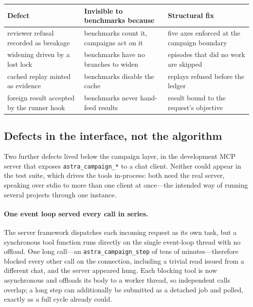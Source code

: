 \documentclass[11pt,a4paper]{article}
\newcommand{\code}[1]{\texttt{\small #1}}
\begin{document}
\begin{center}
\small
\begin{tabular}{@{}p{5.2cm}p{4.3cm}p{4.5cm}@{}}
\toprule
\textbf{Defect} & \textbf{Invisible to benchmarks because} & \textbf{Structural fix} \\
\midrule
reviewer refusal recorded as breakage & benchmarks count it, campaigns act on it &
five axes enforced at the campaign boundary \\
widening driven by a lost lock & benchmarks have no branches to widen &
episodes that did no work are skipped \\
cached replay minted as evidence & benchmarks disable the cache &
replays refused before the ledger \\
foreign result accepted by the runner hook & benchmarks never hand-feed results &
result bound to the request's objective \\
\bottomrule
\end{tabular}
\end{center}

\subsection{Defects in the interface, not the algorithm}
\label{sec:interface}

Two further defects lived below the campaign layer, in the development MCP
server that exposes \code{astra\_campaign\_*} to a chat client. Neither could
appear in the test suite, which drives the tools in-process: both need the real
server, speaking over stdio to more than one client at once---the intended way
of running several projects through one instance.

\paragraph{One event loop served every call in series.} The server framework
dispatches each incoming request as its own task, but a synchronous tool
function runs directly on the single event-loop thread with no offload. One long
call---an \code{astra\_campaign\_step} of tens of minutes---therefore blocked
every other call on the connection, including a trivial read issued from a
different chat, and the server appeared hung. Each blocking tool is now
asynchronous and offloads its body to a worker thread, so independent calls
overlap; a long step can additionally be submitted as a detached job and polled,
exactly as a full cycle already could.
\end{document}
